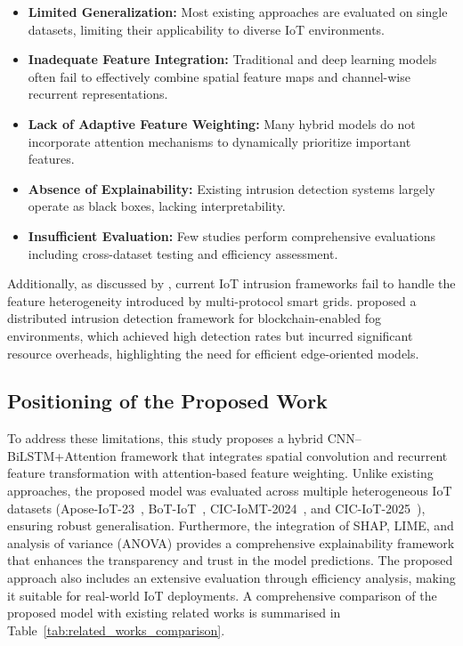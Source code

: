 \documentclass[a4paper,fleqn]{cas-sc}
\begin{document}
\begin{itemize}
    \item \textbf{Limited Generalization:} Most existing approaches are evaluated on single datasets, limiting their applicability to diverse IoT environments.
    
    \item \textbf{Inadequate Feature Integration:} Traditional and deep learning models often fail to effectively combine spatial feature maps and channel-wise recurrent representations.
    
    \item \textbf{Lack of Adaptive Feature Weighting:} Many hybrid models do not incorporate attention mechanisms to dynamically prioritize important features.
    
    \item \textbf{Absence of Explainability:} Existing intrusion detection systems largely operate as black boxes, lacking interpretability.
    
    \item \textbf{Insufficient Evaluation:} Few studies perform comprehensive evaluations including cross-dataset testing and efficiency assessment.
\end{itemize}

Additionally, as discussed by \cite{sgouras2022detecting}, current IoT intrusion frameworks fail to handle the feature heterogeneity introduced by multi-protocol smart grids. \cite{kumar2021eddos} proposed a distributed intrusion detection framework for blockchain-enabled fog environments, which achieved high detection rates but incurred significant resource overheads, highlighting the need for efficient edge-oriented models.

\subsection{Positioning of the Proposed Work}

{\color{blue}To address these limitations, this study proposes a hybrid CNN--BiLSTM+Attention framework that integrates spatial convolution and recurrent feature transformation with attention-based feature weighting.} Unlike existing approaches, the proposed model was evaluated across multiple heterogeneous IoT datasets (Apose-IoT-23~\citep{pecorella2021iot}, BoT-IoT~\citep{moustafa2015bot}, CIC-IoMT-2024~\citep{iomt2024dataset}, and CIC-IoT-2025~\citep{ciciot2025dataset}), ensuring robust generalisation. Furthermore, the integration of SHAP, LIME, and analysis of variance (ANOVA) provides a comprehensive explainability framework that enhances the transparency and trust in the model predictions. The proposed approach also includes an extensive evaluation through efficiency analysis, making it suitable for real-world IoT deployments. A comprehensive comparison of the proposed model with existing related works is summarised in Table~\ref{tab:related_works_comparison}.
\end{document}
